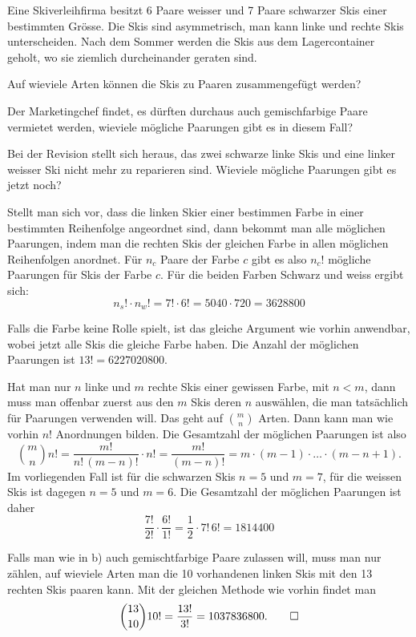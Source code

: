 Eine Skiverleihfirma besitzt 6 Paare weisser und 7 Paare schwarzer Skis
einer bestimmten Grösse. Die Skis sind asymmetrisch, man kann linke
und rechte Skis unterscheiden.
Nach dem Sommer werden die Skis aus dem Lagercontainer geholt, 
wo sie ziemlich durcheinander geraten sind.
\begin{teilaufgaben}
\item Auf wieviele Arten können die Skis zu Paaren zusammengefügt werden?
\item Der Marketingchef findet, es dürften durchaus auch gemischfarbige Paare
vermietet werden, wieviele mögliche Paarungen gibt es in diesem
Fall?
\item Bei der Revision stellt sich heraus, das zwei schwarze linke Skis
und eine linker weisser Ski nicht mehr zu reparieren sind. Wieviele
mögliche Paarungen gibt es jetzt noch?
\end{teilaufgaben}


\begin{loesung}
\begin{teilaufgaben}
\item Stellt man sich vor, dass die linken Skier einer bestimmen
Farbe in einer bestimmten
Reihenfolge angeordnet sind, dann bekommt man alle möglichen Paarungen,
indem man die rechten Skis der gleichen Farbe in allen möglichen
Reihenfolgen anordnet.
Für $n_c$ Paare der Farbe $c$ gibt es also $n_c!$ mögliche
Paarungen für Skis der Farbe $c$. Für die beiden Farben Schwarz
und weiss ergibt sich:
\[
n_s!\cdot n_w!=7!\cdot 6!=5040\cdot 720=3628800
\]
\item
Falls die Farbe keine Rolle spielt, ist das gleiche Argument wie vorhin
anwendbar, wobei jetzt alle Skis die gleiche Farbe haben. Die Anzahl
der möglichen Paarungen ist $13!=6227020800$.
\item
Hat man nur $n$ linke und $m$ rechte Skis einer gewissen Farbe, mit $n<m$,
dann muss man offenbar zuerst aus den $m$ Skis deren $n$ auswählen,
die man tatsächlich für Paarungen verwenden will. Das geht auf $\binom{m}{n}$
Arten. Dann kann man wie vorhin $n!$ Anordnungen bilden. Die Gesamtzahl
der möglichen Paarungen ist also 
\[
\binom{m}{n}n!=\frac{m!}{n!\,(m-n)!}\cdot n!=\frac{m!}{(m-n)!}
=
m\cdot(m-1)\cdot\dots\cdot(m-n+1).
\]
Im vorliegenden Fall ist für die schwarzen Skis $n=5$ und $m=7$,
für die weissen Skis ist dagegen $n=5$ und $m=6$.
Die Gesamtzahl der möglichen Paarungen ist daher
\[
\frac{7!}{2!}\cdot \frac{6!}{1!}
=\frac12\cdot 7!\,6!=1814400
\]
\end{teilaufgaben}
Falls man wie in b) auch gemischtfarbige Paare zulassen will, muss
man nur zählen, auf wieviele Arten man die 10 vorhandenen
linken Skis mit den 13 rechten Skis paaren kann. Mit der gleichen
Methode wie vorhin findet man
\[
\binom{13}{10}10!=\frac{13!}{3!}=1037836800.
\qedhere
\]
\end{loesung}


